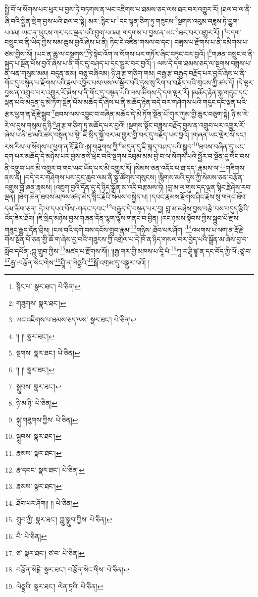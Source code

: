 སྤྱི་བོ་ལ་སོགས་པར་ཕུར་པ་བྱས་ཏེ་བཏགས་ན་ཡང་འཇིགས་པ་ཐམས་ཅད་ལས་ཐར་བར་འགྱུར་རོ། །ཐལ་བ་ལ་ནི་ཞི་བའི་སྦྱིན་སྲེག་བྱས་པའི་ཐལ་བ་སྟེ། མར་:རྙིང་པ་\footnote{སྙིང་པ་  སྣར་ཐང་།  པེ་ཅིན། }དང་ལྷན་ཅིག་ཏུ་གཟུངས་\footnote{གཟུགས་  སྣར་ཐང་། }སྔགས་འབུམ་བཟླས་ཏེ་བྱུག་པའམ། ཡང་ན་ཡུངས་ཀར་དང་ལྡན་པའི་བྱུག་པའམ། གདགས་པ་བྱས་ན་ཡང་\footnote{ཡང་འཇིགས་པ་ཐམས་ཅད་ལས་  སྣར་ཐང་།  པེ་ཅིན། }ཐར་བར་འགྱུར་རོ། །\footnote{།། །།  སྣར་ཐང་། }བདག་བསྲུང་བ་ནི་ཡིད་ཀྱིས་སམ་ཆུས་བྱའོ་ཞེས་པ་ནི། ཏིང་ངེ་འཛིན་གསལ་བ་དང་། བཟླས་པ་རྫོགས་པ་ནི་དམིགས་པ་ཙམ་གྱིས་སོ། །ཡང་ན་ཆུ་ལ་བསྔགས་\footnote{སྔགས་  སྣར་ཐང་།  པེ་ཅིན། }ཏེ་སྟེང་འོག་ལ་སོགས་པར་གཏོར་ཞིང་བཏུང་བར་བྱའོ། །\footnote{།། །།  སྣར་ཐང་། }གཞན་བསྲུང་བ་ནི་སྐུད་པ་སྔོན་པོས་བྱའོ་ཞེས་པ་ནི་གོང་དུ་བཤད་པ་དང་སྦྱར་བར་བྱའོ། །
ལས་དེ་དག་ཐམས་ཅད་ལ་སྔགས་བཟླས་པ་ནི་ལན་གསུམ་མམ། བདུན་ནམ། བཅུ་བཞིའམ། ཉི་ཤུ་རྩ་གཅིག་གམ། བརྒྱ་རྩ་བརྒྱད་བརྗོད་པར་བྱའོ་ཞེས་པ་ནི་གོང་དུ་བསྙེན་པ་རྫོགས་པའི་རྣལ་འབྱོར་པས་ལས་ལ་སྦྱོར་བའི་དུས་སུ་རིག་པ་བརྗོད་པའི་གྲངས་ཀྱི་ཚད་དོ། །དེ་ལྟར་བྱས་ན་འགྲུབ་པར་འགྱུར་རོ་ཞེས་པ་ནི་གོང་དུ་བསྟན་པའི་ལས་ཚོགས་དེ་དག་ལྟར་རོ། །མཆོད་རྟེན་སྐུ་གདུང་དང་ལྡན་པའི་མདུན་དུ་མེ་ཏོག་སྔོན་པོས་མཆོད་དོ་ཞེས་པ་ནི་མཆོད་རྟེན་བདེ་བར་གཤེགས་པའི་གདུང་དང་ལྡན་པའི་རྩར་ཕྱག་ན་རྡོ་རྗེ་སྒྲུབ་\footnote{སྒྲུབས་  སྣར་ཐང་། }ཐབས་ལས་འབྱུང་བ་བཞིན་མཆོད་དེ་མེ་ཏོག་སྔོན་པོ་གུར་ཀུམ་གྱི་ཆུར་བཅུག་སྟེ། ཉི་མ་རེ་རེ་ལ་དུས་གསུམ་དུ་ཉི་\footnote{ཉི་མ་ཉི་  པེ་ཅིན། }ཤུ་རྩ་གཅིག་ཏུ་མཆོད་པར་བྱའོ། །སྔགས་སྟོང་བཟླས་བརྗོད་བྱས་ན་འགྲུབ་པར་འགྱུར་རོ་ཞེས་པ་ནི་ཐ་མའི་ཚད་བསྟན་པ་སྟེ། ཇི་སྲིད་སྐྱོ་བར་མ་གྱུར་གྱི་བར་དུ་བརྗོད་པར་བྱའོ། །གཞན་ཡང་ལྡེར་སོ་དང་། རས་རིས་ལ་སོགས་པ་ཕྱག་ན་རྡོ་རྗེའི་:སྐུ་གཟུགས་ཀྱི་\footnote{སྐུ་གཟུགས་ཀྱིས་  པེ་ཅིན། }མདུན་དུ་ཇི་སྐད་བཤད་པའི་སྒྲུབ་\footnote{སྒྲུབས་  སྣར་ཐང་། }ཐབས་བཞིན་དུ་ཡང་དག་པར་མཆོད་དེ་མཉེས་པར་བྱས་ནས་ཕྲེང་བའི་སྔགས་འབུམ་མམ་བྱེ་བ་ལ་སོགས་པའི་སྦྱོར་བ་སྔོན་དུ་སོང་བས་ནི་འགྲུབ་པར་མི་འགྱུར་བ་གང་ཡང་ཡོད་པར་མི་འགྱུར་རོ། །སེམས་ཅན་འདོད་པ་ཐ་དད་:རྣམས་ལ་\footnote{རྣམས་  སྣར་ཐང་། }གཟིགས་ནས་ནི། །བདེ་བར་གཤེགས་པས་བྱང་ཆུབ་ལམ་ནི་སྣ་ཚོགས་གསུངས། །སྙིགས་མའི་དུས་ཀྱི་སེམས་ཅན་བརྩོན་འགྲུས་བློ་ཞན་རྣམས། །འཇུག་བྱའི་དོན་དུ་དེ་ཉིད་སྒྲོན་མ་འདི་བརྩམས་ཏེ། །བླ་མ་ལ་གུས་དད་ལྡན་སྙིང་རྗེ་ཤེས་རབ་ལྡན། །ཐེག་ཆེན་ཐབས་མཁས་ཚད་མེད་སྙིང་རྗེའི་སེམས་བསྐྱེད་པ། །དབང་རྣམས་རྫོགས་ཤིང་རྗེས་སུ་གནང་ཐོབ་དམ་ཚིག་ཅན། དེ་ལ་དཔའ་བོས་:གནང་དབང་\footnote{རྣ་དབང་  སྣར་ཐང་།  པེ་ཅིན། }བརྒྱུད་དེ་བསྟན་པར་བྱ། བླ་མ་མཉེས་བྱས་བརྩེ་བས་བདུད་རྩིའི་འོད་ཟེར་ཐོབ། །ཇི་སྲིད་མཉེས་བྱས་གཞན་དོན་ལྷག་ལྷས་གནང་བ་བྱིན། །རང་ཉམས་སྟོབས་ཀྱིས་སྒྲུབ་པོ་རྫས་གཟུང་རྒྱུད་དོན་བྲིས། །ངལ་བའི་དགེ་བས་དངོས་གྲུབ་རྣམ་\footnote{རྣམས་  སྣར་ཐང་། }གཉིས་:ཐོབ་པར་ཤོག ་\footnote{ཐོབ་པར་ཤོག།། །།  པེ་ཅིན། }འཕགས་པ་ལག་ན་རྡོ་རྗེ་གོས་སྔོན་པོ་ཅན་གྱི་ཆོ་ག་ཞེས་བྱ་བའི་གཟུངས་ཀྱི་འགྲེལ་པ་དེ་ཁོ་ན་ཉིད་གསལ་བར་བྱེད་པའི་སྒྲོན་མ་ཞེས་བྱ་བ་སློབ་དཔོན་:ཀླུ་གྲུབ་ཀྱིས་\footnote{གྲུབ་ཀྱི་  སྣར་ཐང་། ཀླུ་སྒྲུབ་ཀྱིས་  པེ་ཅིན། }མཛད་པ་རྫོགས་སོ།། །།རྒྱ་གར་གྱི་མཁས་པ་དཱི་པཾ་\footnote{པྃ་  པེ་ཅིན། }ཀཱ་ར་ཤྲཱི་ཛྙཱ་ན་དང་བོད་ཀྱི་ལོ་:ཙཱ་བ་\footnote{ཙ་  སྣར་ཐང་། ཙ་བ་  པེ་ཅིན། }རྒྱ་:བརྩོན་སེང་གེས་\footnote{བརྩོན་སེངྒེ་  སྣར་ཐང་། བརྩོན་སེང་གིས་  པེ་ཅིན། }ཤྲཱི་ན་ལེནྡྲའི་\footnote{ལེནྟྲའི་  སྣར་ཐང་། ལེན་ཏྲའི་  པེ་ཅིན། }སྒོ་འགྲམ་དུ་བསྒྱུར་བའོ། ། 